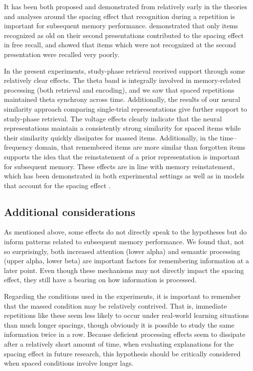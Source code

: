 It has been both proposed and demonstrated from relatively early in the theories and analyses around the spacing effect that recognition during a repetition is important for subsequent memory performance.   demonstrated that only items recognized as old on their second presentations contributed to the spacing effect in free recall, and  showed that items which were not recognized at the second presentation were recalled very poorly.

In the present experiments, study-phase retrieval received support through some relatively clear effects.  The theta band is integrally involved in memory-related processing (both retrieval and encoding), and we saw that spaced repetitions maintained theta synchrony across time.  Additionally, the results of our neural similarity approach comparing single-trial representations give further support to study-phase retrieval.  The voltage effects clearly indicate that the neural representations
maintain a consistently strong similarity for spaced items while their similarity quickly dissipates for massed items.  Additionally, in the time--frequency domain, that remembered items are more similar than forgotten items supports the idea that the reinstatement of a prior representation is important for subsequent memory.
These effects are in line with memory reinstatement, which has been demonstrated in both experimental settings \cite{MannEtal2011} as well as in models that account for the spacing effect \cite{LohnKaha2014b}.

\subsection{Additional considerations}

As mentioned above, some effects do not directly speak to the hypotheses but do inform patterns related to subsequent memory performance.  We found that, not so surprisingly, both increased attention (lower alpha) and semantic processing (upper alpha, lower beta) are important factors for remembering information at a later point.  Even though these mechanisms may not directly impact the spacing effect, they still have a bearing on how information is processed.

Regarding the conditions used in the experiments,
it is important to remember that the massed condition may be relatively contrived.
That is, immediate repetitions like these seem less likely to occur under real-world learning situations than much longer spacings, though obviously it is possible to study the same information twice in a row.  Because deficient processing effects seem to dissipate after a relatively short amount of time, when evaluating explanations for the spacing effect in future research, this hypothesis should be critically considered when spaced conditions involve longer lags.

